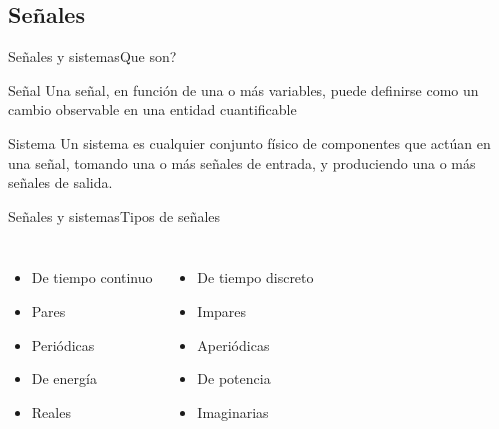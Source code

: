  \subsection{Señales}
 \begin{frame}{Señales y sistemas}{Que son?}
    \begin{block}{Señal}
       Una señal, en función de una o más variables, puede definirse como un cambio observable en una entidad cuantificable
    \end{block}
    \begin{block}{Sistema}
       Un sistema es cualquier conjunto físico de componentes que actúan en una señal, tomando una o más señales de entrada, y produciendo una o más señales de salida.
    \end{block}
 \end{frame}
 \begin{frame}{Señales y sistemas}{Tipos de señales}
    \begin{columns}[onlytextwidth]
       \begin{itemize}
          \item{De tiempo continuo}
          \item{Pares}
          \item{Periódicas}
          \item{De energía}
          \item{Reales}
       \end{itemize}
       \begin{itemize}
          \item{De tiempo discreto}
          \item{Impares}
          \item{Aperiódicas}
          \item{De potencia}
          \item{Imaginarias}
       \end{itemize}
    \end{columns}
 \end{frame}

